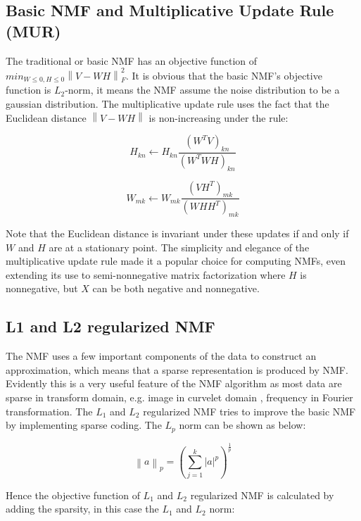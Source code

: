\documentclass{article} %
\begin{document}
\subsection{Basic NMF and Multiplicative Update Rule (MUR)}
The traditional or basic NMF has an objective function of $min_{W \leq 0, H \leq 0}\left\|V - WH\right\|_F^2$. \cite{source1} It is obvious that the basic NMF's objective function is $L_2$-norm, it means the NMF assume the noise distribution to be a gaussian distribution. The multiplicative update rule uses the fact that the Euclidean distance $\left\|V - WH\right\|$ is non-increasing under the rule:

\begin{equation}
H_{kn} \leftarrow H_{kn} \frac{\left(W^T V\right)_{kn}}{\left(W^T WH\right)_{kn}}
\end{equation}

\begin{equation}
W_{mk} \leftarrow W_{mk} \frac{\left(V H^T\right)_{mk}}{\left(WH H^T\right)_{mk}}
\end{equation}

Note that the Euclidean distance is invariant under these updates if and only if $W$ and $H$ are at a stationary point. \cite{source2} The simplicity and elegance of the multiplicative update rule made it a popular choice for computing NMFs, even extending its use to semi-nonnegative matrix factorization where $H$ is nonnegative, but $X$ can be both negative and nonnegative. \cite{source3}

\subsection{L1 and L2 regularized NMF}
The NMF uses a few important components of the data to construct an approximation, which means that a sparse representation is produced by NMF. \cite{source4} Evidently this is a very useful feature of the NMF algorithm as most data are sparse in transform domain, e.g. image in curvelet domain \cite{source5}, frequency in Fourier transformation. \cite{source6} The $L_1$ and $L_2$ regularized NMF tries to improve the basic NMF by implementing sparse coding. The $L_p$ norm can be shown as below:

\begin{equation}
\left\|a\right\|_p = \left(\sum_{j=1}^{k}\left|a\right|^p\right)^{\frac{1}{p}}
\end{equation}

Hence the objective function of $L_1$ and $L_2$ regularized NMF is calculated by adding the sparsity, in this case the $L_1$ and $L_2$ norm:
\end{document}
